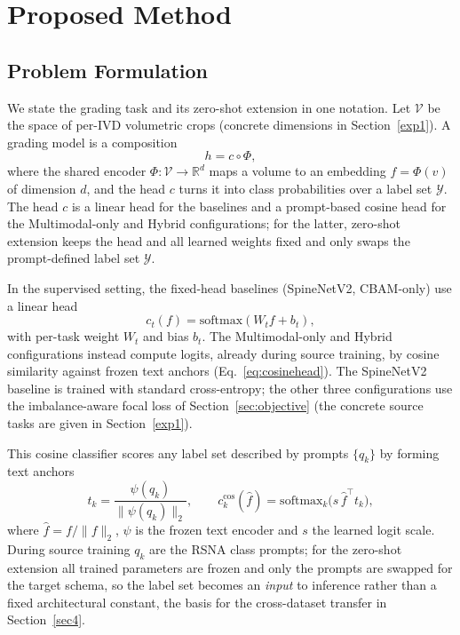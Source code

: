 \documentclass[runningheads]{llncs}
\begin{document}
\section{Proposed Method}\label{sec3}

\subsection{Problem Formulation}\label{sec:formulation}

We state the grading task and its zero-shot extension in one notation. Let $\mathcal{V}$ be the space of per-IVD volumetric crops (concrete dimensions in Section~\ref{exp1}). A grading model is a composition
\begin{equation}
h = c \circ \Phi,
\label{eq:composition}
\end{equation}
where the shared encoder $\Phi:\mathcal{V}\to\mathbb{R}^{d}$ maps a volume to an embedding $f=\Phi(v)$ of dimension $d$, and the head $c$ turns it into class probabilities over a label set $\mathcal{Y}$. The head $c$ is a linear head for the baselines and a prompt-based cosine head for the Multimodal-only and Hybrid configurations; for the latter, zero-shot extension keeps the head and all learned weights fixed and only swaps the prompt-defined label set $\mathcal{Y}$.

In the supervised setting, the fixed-head baselines (SpineNetV2, CBAM-only) use a linear head
\begin{equation}
c_t(f) = \mathrm{softmax}(W_t f + b_t),
\label{eq:linhead}
\end{equation}
with per-task weight $W_t$ and bias $b_t$. The Multimodal-only and Hybrid configurations instead compute logits, already during source training, by cosine similarity against frozen text anchors (Eq.~\ref{eq:cosinehead}). The SpineNetV2 baseline is trained with standard cross-entropy; the other three configurations use the imbalance-aware focal loss of Section~\ref{sec:objective} (the concrete source tasks are given in Section~\ref{exp1}).

This cosine classifier scores any label set described by prompts $\{q_k\}$ by forming text anchors
\begin{equation}
t_k = \frac{\psi(q_k)}{\|\psi(q_k)\|_2},
\qquad
c^{\text{cos}}_k(\hat f) = \mathrm{softmax}_k\!\big(s\,\hat f^{\top} t_k\big),
\label{eq:cosinehead}
\end{equation}
where $\hat f = f/\|f\|_2$, $\psi$ is the frozen text encoder and $s$ the learned logit scale. During source training $q_k$ are the RSNA class prompts; for the zero-shot extension all trained parameters are frozen and only the prompts are swapped for the target schema, so the label set becomes an \emph{input} to inference rather than a fixed architectural constant, the basis for the cross-dataset transfer in Section~\ref{sec4}.
\end{document}

